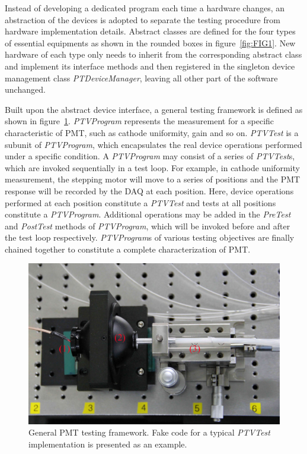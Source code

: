\documentclass{JINST}
\begin{document}
Instead of developing a dedicated program each time a hardware changes, an abstraction of the devices is adopted to separate the testing procedure from hardware implementation details. 
Abstract classes are defined for the four types of essential equipments as shown in the rounded boxes in figure~\ref{fig:FIG1}.
New hardware of each type only needs to inherit from the corresponding abstract class and implement its interface methods and then registered in the singleton device management class \textit{PTDeviceManager}, leaving all other part of the software unchanged.
	
Built upon the abstract device interface, a general testing framework is defined as shown in figure~\ref{fig:FIG4}.
\textit{PTVProgram} represents the measurement for a specific characteristic of PMT, such as cathode uniformity, gain and so on.
\textit{PTVTest} is a subunit of \textit{PTVProgram}, which encapsulates the real device operations performed under a specific condition.
A \textit{PTVProgram} may consist of a series of \textit{PTVTest}s, which are invoked sequentially in a test loop.
For example, in cathode uniformity measurement, the stepping motor will move to a series of positions and the PMT response will be recorded by the DAQ at each position.
Here, device operations performed at each position constitute a \textit{PTVTest} and tests at all positions constitute a \textit{PTVProgram}.
Additional operations may be added in the \textit{PreTest} and \textit{PostTest} methods of \textit{PTVProgram}, which will be invoked before and after the test loop respectively.
\textit{PTVProgram}s of various testing objectives are finally chained together to constitute a complete characterization of PMT.
	
\begin{figure}[tbp]
	\centering
	\includegraphics[width=120mm]{FIG4}
	\caption{General PMT testing framework.
		Fake code for a typical \textit{PTVTest} implementation is presented as an example.}
	\label{fig:FIG4}
\end{figure}
\end{document}
